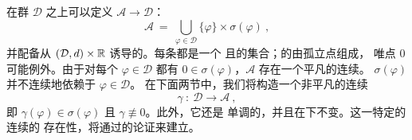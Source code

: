 在群 $\mathcal{D}$ 之上可以定义\trActionSpectrum{}\trBundle{}%
$\mathcal{A}\to\mathcal{D}$：
\begin{equation*}
\mathcal{A}\ =\ \bigcup_{\varphi\in\mathcal{D}}\{\varphi\}\times\sigma(\varphi)\ ,
\end{equation*}
并配备从 $(\mathcal{D},d)\times\mathbb{R}$ 诱导的\trMetric。每条\trFiber{}都是一个%
\trCompact{}且\trNowhereDense{}的集合；\trGeneric{}的\trFiber{}由孤立点组成，%
唯点 $0$ 可能例外。由于对每个 $\varphi\in\mathcal{D}$ 都有%
$0\in\sigma(\varphi)$，$\mathcal{A}$ 存在一个平凡的连续\trSection。%
\trActionSpectrum{} $\sigma(\varphi)$ 并不连续地依赖于 $\varphi\in\mathcal{D}$。%
在下面两节中，我们将构造一个非平凡的连续\trSection
\begin{equation*}
\gamma\ :\ \mathcal{D}\longrightarrow\mathcal{A}\ ,
\end{equation*}
即 $\gamma(\varphi)\in\sigma(\varphi)$ 且 $\gamma\not\equiv0$。此外，它还是%
单调的，并且在\trSymplectic\trConjugate{}下不变。这一特定的连续\trSection{}的%
存在性，将通过\trActionFunctional{}的\trMinimax{}论证来建立。
